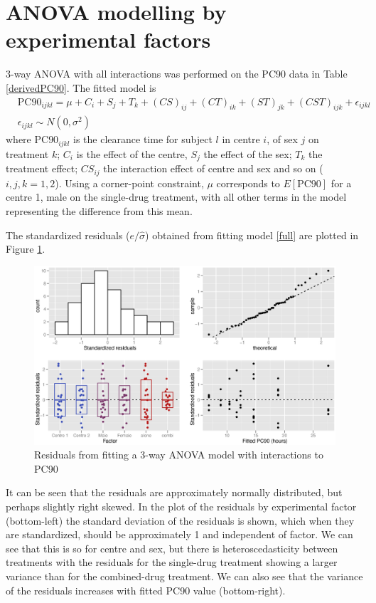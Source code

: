\section{ANOVA modelling by experimental factors}
3-way ANOVA with all interactions was performed on the PC90 data in Table \ref{derivedPC90}. The fitted model is
\begin{eqnarray}
&\mathrm{PC}90_{ijkl}=\mu+C_i+S_j+T_k+(CS)_{ij}+(CT)_{ik}+(ST)_{jk}+(CST)_{ijk}+\epsilon_{ijkl}&\nonumber\\
&\epsilon_{ijkl}\sim N(0,\sigma^2)&\label{full}
\end{eqnarray}
where PC$90_{ijkl}$ is the clearance time for subject $l$ in centre $i$, of sex $j$ on treatment $k$; $C_i$ is the effect of the centre, $S_j$ the effect of the sex; $T_k$ the treatment effect; $CS_{ij}$ the interaction effect of centre and sex and so on ($i,j,k=1,2$). Using a corner-point constraint, $\mu$ corresponds to $E[\mathrm{PC}90]$ for a centre 1, male on the single-drug treatment, with all other terms in the model representing the difference from this mean.

The standardized residuals ($e/\hat{\sigma}$) obtained from fitting model \ref{full} are plotted in Figure \ref{aovloglinres}.
\begin{figure}[ht]
\includegraphics[width=150mm]{aovloglinres.eps} 
\caption{Residuals from fitting a 3-way ANOVA model with interactions to PC90}
\label{aovloglinres}
\end{figure}

It can be seen that the residuals are approximately normally distributed, but perhaps slightly right skewed. In the plot of the residuals by experimental factor (bottom-left) the standard deviation of the residuals is shown, which when they are standardized, should be approximately 1 and independent of factor. We can see that this is so for centre and sex, but there is heteroscedasticity between treatments with the residuals for the single-drug treatment showing a larger variance than for the combined-drug treatment.
We can also see that the variance of the residuals increases with fitted PC90 value (bottom-right).

